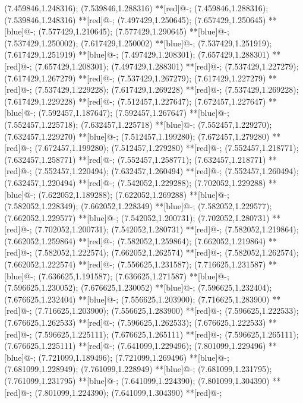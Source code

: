 (7.459846,1.248316); (7.539846,1.288316) **[red]@{-};
(7.459846,1.288316); (7.539846,1.248316) **[red]@{-};
(7.497429,1.250645); (7.657429,1.250645) **[blue]@{-};
(7.577429,1.210645); (7.577429,1.290645) **[blue]@{-};
(7.537429,1.250002); (7.617429,1.250002) **[blue]@{-};
(7.537429,1.251919); (7.617429,1.251919) **[blue]@{-};
(7.497429,1.208301); (7.657429,1.288301) **[red]@{-};
(7.657429,1.208301); (7.497429,1.288301) **[red]@{-};
(7.537429,1.227279); (7.617429,1.267279) **[red]@{-};
(7.537429,1.267279); (7.617429,1.227279) **[red]@{-};
(7.537429,1.229228); (7.617429,1.269228) **[red]@{-};
(7.537429,1.269228); (7.617429,1.229228) **[red]@{-};
(7.512457,1.227647); (7.672457,1.227647) **[blue]@{-};
(7.592457,1.187647); (7.592457,1.267647) **[blue]@{-};
(7.552457,1.225718); (7.632457,1.225718) **[blue]@{-};
(7.552457,1.229270); (7.632457,1.229270) **[blue]@{-};
(7.512457,1.199280); (7.672457,1.279280) **[red]@{-};
(7.672457,1.199280); (7.512457,1.279280) **[red]@{-};
(7.552457,1.218771); (7.632457,1.258771) **[red]@{-};
(7.552457,1.258771); (7.632457,1.218771) **[red]@{-};
(7.552457,1.220494); (7.632457,1.260494) **[red]@{-};
(7.552457,1.260494); (7.632457,1.220494) **[red]@{-};
(7.542052,1.229288); (7.702052,1.229288) **[blue]@{-};
(7.622052,1.189288); (7.622052,1.269288) **[blue]@{-};
(7.582052,1.228349); (7.662052,1.228349) **[blue]@{-};
(7.582052,1.229577); (7.662052,1.229577) **[blue]@{-};
(7.542052,1.200731); (7.702052,1.280731) **[red]@{-};
(7.702052,1.200731); (7.542052,1.280731) **[red]@{-};
(7.582052,1.219864); (7.662052,1.259864) **[red]@{-};
(7.582052,1.259864); (7.662052,1.219864) **[red]@{-};
(7.582052,1.222574); (7.662052,1.262574) **[red]@{-};
(7.582052,1.262574); (7.662052,1.222574) **[red]@{-};
(7.556625,1.231587); (7.716625,1.231587) **[blue]@{-};
(7.636625,1.191587); (7.636625,1.271587) **[blue]@{-};
(7.596625,1.230052); (7.676625,1.230052) **[blue]@{-};
(7.596625,1.232404); (7.676625,1.232404) **[blue]@{-};
(7.556625,1.203900); (7.716625,1.283900) **[red]@{-};
(7.716625,1.203900); (7.556625,1.283900) **[red]@{-};
(7.596625,1.222533); (7.676625,1.262533) **[red]@{-};
(7.596625,1.262533); (7.676625,1.222533) **[red]@{-};
(7.596625,1.225111); (7.676625,1.265111) **[red]@{-};
(7.596625,1.265111); (7.676625,1.225111) **[red]@{-};
(7.641099,1.229496); (7.801099,1.229496) **[blue]@{-};
(7.721099,1.189496); (7.721099,1.269496) **[blue]@{-};
(7.681099,1.228949); (7.761099,1.228949) **[blue]@{-};
(7.681099,1.231795); (7.761099,1.231795) **[blue]@{-};
(7.641099,1.224390); (7.801099,1.304390) **[red]@{-};
(7.801099,1.224390); (7.641099,1.304390) **[red]@{-};
